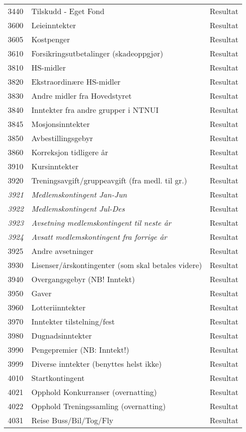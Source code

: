 \begin{longtable}{l l l}
3440 & Tilskudd - Eget Fond & Resultat\\
3600 & Leieinntekter & Resultat\\
3605 & Kostpenger & Resultat\\
3610 & Forsikringsutbetalinger (skadeoppgjør) & Resultat\\
3810 & HS-midler & Resultat\\
3820 & Ekstraordinære HS-midler & Resultat\\
3830 & Andre midler fra Hovedstyret & Resultat\\
3840 & Inntekter fra andre grupper i NTNUI & Resultat\\
3845 & Mosjonsinntekter & Resultat\\
3850 & Avbestillingsgebyr & Resultat\\
3860 & Korreksjon tidligere år & Resultat\\
3910 & Kursinntekter & Resultat\\
3920 & Treningsavgift/gruppeavgift (fra medl. til gr.) & Resultat\\
\emph{3921} & \emph{Medlemskontingent Jan-Jun} & Resultat\\
\emph{3922} & \emph{Medlemskontingent Jul-Des} & Resultat\\
\emph{3923} & \emph{Avsetning medlemskontingent til neste år} & Resultat\\
\emph{3924} & \emph{Avsatt medlemskontingent fra forrige år} & Resultat\\
3925 & Andre avsetninger & Resultat\\
3930 & Lisenser/årskontingenter (som skal betales videre) & Resultat\\
3940 & Overgangsgebyr (NB! Inntekt) & Resultat\\
3950 & Gaver & Resultat\\
3960 & Lotteriinntekter & Resultat\\
3970 & Inntekter tilstelning/fest & Resultat\\
3980 & Dugnadsinntekter & Resultat\\
3990 & Pengepremier (NB: Inntekt!) & Resultat\\
3999 & Diverse inntekter (benyttes helst ikke) & Resultat\\
4010 & Startkontingent & Resultat\\
4021 & Opphold Konkurranser (overnatting) & Resultat\\
4022 & Opphold Treningssamling (overnatting) & Resultat\\
4031 & Reise Buss/Bil/Tog/Fly & Resultat\\

\end{longtable}
